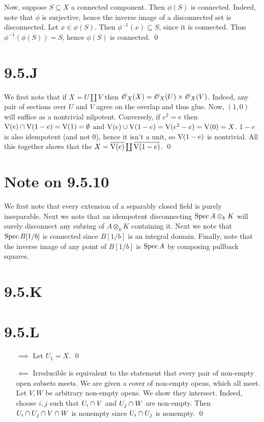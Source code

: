 \documentclass{article}
\begin{document}
Now, suppose $S \subseteq X$ a connected component. Then
$\phi(S)$ is connected. Indeed, note that $\phi$
is surjective, hence the inverse image of a disconnected set is disconnected.
Let $x \in \phi(S)$. Then $\phi^{-1}(x) \subseteq S$, since it is
connected. Thus $\phi^{-1}(\phi(S)) = S$, hence $\phi(S)$ is
connected. \qed

\section{9.5.J}
We first note that if $X=U \coprod V$ then $\operatorname{\mathscr{O}}_X(X)=\operatorname{\mathscr{O}}_X(U) \times \operatorname{\mathscr{O}}_X(V)$.
Indeed, any pair of sections over $U$ and
$V$ agree on the overlap and thus glue. Now,
$(1,0)$ will suffice as a nontrivial nilpotent. Conversely, if
$e^2=e$ then $\operatorname{V}(e) \cap \operatorname{V}(1-e)
    =\operatorname{V}(1)= \emptyset$ and
$\operatorname{V}(e) \cup
    \operatorname{V}(1-e)=\operatorname{V}(e^2-e)=\operatorname{V}(0)=X$. $1-e$ is also idempotent (and not
0), hence it isn't a unit, so $\operatorname{V}(1-e)$ is nontrivial. All this
together shows that the $X=\overline{\operatorname{V}(e)} \coprod \overline{\operatorname{V}(1-e)}$. \qed

\section{Note on 9.5.10}
We first note that every extension of a separably closed field is purely
inseparable. Next we note that an idempotent disconnecting
$\operatorname{Spec} A \otimes_k K$ will surely disconnect any subring of
$A \otimes_k K$ containing it. Next we note that
$\operatorname{Spec} B[1/b]$ is connected since $B[1/b]$ is an
integral domain. Finally, note that the inverse image of any point of
$B[1/b]$ is $\operatorname{Spec} A$ by composing pullback
squares.

\section{9.5.K}

\section{9.5.L}
\begin{itemize}
    \item[$\implies$] Let $U_1=X$. \qed
    \item[$\impliedby$] Irreducible is equivalent to the statement that every pair of non-empty open
        subsets meets. We are given a cover of non-empty opens, which all meet. Let
        $V, W$ be arbitrary non-empty opens. We show they intersect.
        Indeed, choose $i, j$ such that $U_i \cap V$ and
        $U_j \cap W$ are non-empty. Then $U_i \cap U_j \cap V \cap W$ is nonempty
        since $U_i \cap U_j$ is nonempty. \qed
\end{itemize}
\end{document}
